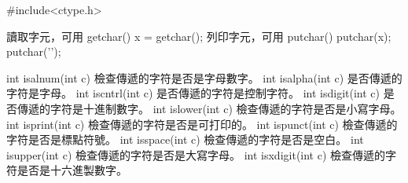 #include<ctype.h>

讀取字元，可用 getchar()
x = getchar();
列印字元，可用 putchar()
putchar(x);
putchar('\n');

int isalnum(int c) 檢查傳遞的字符是否是字母數字。
int isalpha(int c) 是否傳遞的字符是字母。
int iscntrl(int c) 是否傳遞的字符是控制字符。
int isdigit(int c) 是否傳遞的字符是十進制數字。
int islower(int c) 檢查傳遞的字符是否是小寫字母。
int isprint(int c) 檢查傳遞的字符是否是可打印的。
int ispunct(int c) 檢查傳遞的字符是否是標點符號。
int isspace(int c) 檢查傳遞的字符是否是空白。
int isupper(int c) 檢查傳遞的字符是否是大寫字母。
int isxdigit(int c) 檢查傳遞的字符是否是十六進製數字。